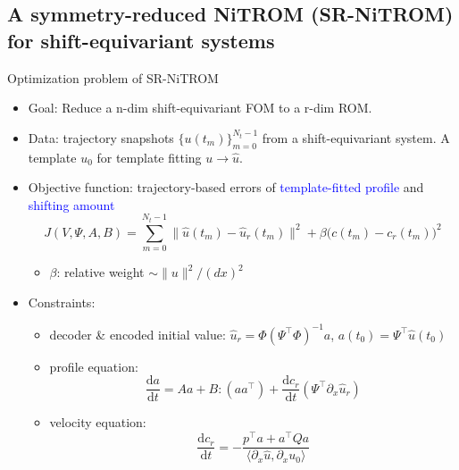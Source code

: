 \documentclass[presentation]{beamer}
\begin{document}
\subsection{A symmetry-reduced NiTROM (SR-NiTROM) for shift-equivariant systems}
\label{sec:orgae63797}
\begin{frame}[label={sec:org110a2ea}]{Optimization problem of SR-NiTROM}
\begin{itemize}[<+->]
\item Goal: Reduce a n-dim shift-equivariant FOM to a r-dim ROM.
\item Data: trajectory snapshots \(\{u(t_{m})\}_{m = 0}^{N_{t} - 1}\) from a shift-equivariant system. A template \(u_{0}\) for template fitting \(u\to\widehat{u}\).
\item Objective function: trajectory-based errors of \textcolor{blue}{template-fitted profile} and \textcolor{blue}{shifting amount} 
\begin{equation}
  \label{eq:6}
  J(V, \Psi, A, B) = \sum_{m = 0}^{N_{t}-1} \|\widehat{u}(t_{m}) - \widehat{u}_{r}(t_{m})\|^{2} + \beta\bigg(c(t_{m}) - c_{r}(t_{m})\bigg)^{2}
\end{equation}
\begin{itemize}
\item \(\beta\): relative weight \(\sim \|u\|^{2}/(dx)^{2}\)
\end{itemize}
\item Constraints:
\begin{itemize}
\item decoder \& encoded initial value: \(\widehat{u}_{r} = \Phi(\Psi^{\top}\Phi)^{-1}a\), \(a(t_{0}) = \Psi^{\top}\widehat{u}(t_{0})\)
\item profile equation: 
\begin{equation}
  \label{eq:7}
  \frac{\mathrm{d}a}{\mathrm{d}t} = Aa + B:(aa^{\top}) + \frac{\mathrm{d}c_{r}}{\mathrm{d}t}(\Psi^{\top}\partial_{x}\widehat{u}_{r})
\end{equation}
\item velocity equation:
\begin{equation}
  \label{eq:8}
  \frac{\mathrm{d}c_{r}}{\mathrm{d}t} = -\frac{p^{\top}a + a^{\top}Qa}{\langle\partial_{x}\widehat{u}, \partial_{x}u_{0}\rangle}
\end{equation}
\end{itemize}
\end{itemize}
\end{frame}
\end{document}
